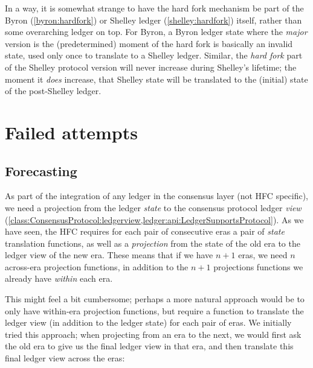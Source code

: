 In a way, it is somewhat strange to have the hard fork mechanism be part of the
Byron (\cref{byron:hardfork}) or Shelley ledger (\cref{shelley:hardfork})
itself, rather than some overarching ledger on top. For Byron, a Byron ledger
state where the \emph{major} version is the (predetermined) moment of the hard
fork is basically an invalid state, used only once to translate to a Shelley
ledger. Similar, the \emph{hard fork} part of the Shelley protocol version will
never increase during Shelley's lifetime; the moment it \emph{does} increase,
that Shelley state will be translated to the (initial) state of the post-Shelley
ledger.

\section{Failed attempts}

\subsection{Forecasting}

As part of the integration of any ledger in the consensus layer (not HFC
specific), we need a projection from the ledger \emph{state} to the consensus
protocol ledger \emph{view}
(\cref{class:ConsensusProtocol:ledgerview,ledger:api:LedgerSupportsProtocol}).
As we have seen,
the HFC requires for each pair of consecutive eras a pair of \emph{state} translation
functions, as well as a \emph{projection} from the state of the old era to the
ledger view of the new era. These means that if we have $n + 1$ eras, we need
$n$ across-era projection functions, in addition to the $n + 1$ projections
functions we already have \emph{within} each era.

This might feel a bit cumbersome; perhaps a more natural approach would be to
only have within-era projection functions, but require a function to translate
the ledger view (in addition to the ledger state) for each pair of eras.
We initially tried this approach; when projecting from an era to the next,
we would first ask the old era to give us the final ledger view in that era,
and then translate this final ledger view across the eras:

